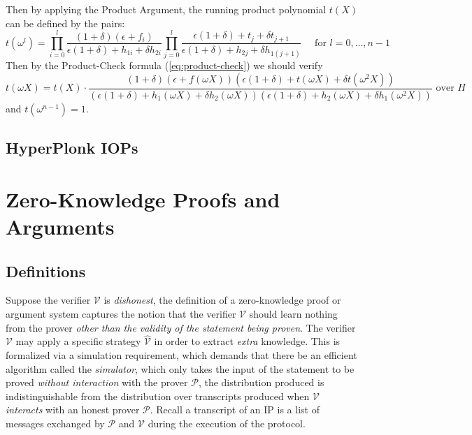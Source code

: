 \documentclass{article}
\begin{document}
Then by applying the Product Argument, the running product polynomial $t(X)$ can be defined by the pairs:
\begin{equation*}
t(\omega^l) = \prod_{i = 0}^{l} \frac{(1 + \delta) (\epsilon + f_i)}{\epsilon(1 + \delta) + h_{1i} + \delta h_{2i}} \prod_{j = 0}^{l} \frac{\epsilon(1 + \delta) + t_j + \delta t_{j + 1}}{\epsilon(1 + \delta) + h_{2j} + \delta h_{1(j+1)}} \quad \text{ for } l = 0, \dots, n-1
\end{equation*}
Then by the Product-Check formula (\ref{eq:product-check}) we should verify 
\begin{equation*}
t(\omega X) = t(X) \cdot \frac{(1 + \delta) (\epsilon + f(\omega X)) (\epsilon ( 1 + \delta) + t(\omega X) + \delta t(\omega^2 X))}{(\epsilon (1 + \delta) + h_1(\omega X) + \delta h_2(\omega X)) (\epsilon (1 + \delta) + h_2(\omega X) + \delta h_1(\omega^2 X))} \text{ over } H 
\end{equation*}
and $t(\omega^{n-1}) = 1$.

\subsection{HyperPlonk IOPs}

\cite{chen2022hyperplonk}

\section{Zero-Knowledge Proofs and Arguments}

\subsection{Definitions}

Suppose the verifier $\mathcal{V}$ is \textit{dishonest}, the definition of a zero-knowledge proof or argument system captures the notion that the verifier $\mathcal{V}$ should learn nothing from the prover \textit{other than the validity of the statement being proven}. The verifier $\mathcal{V}$ may apply a specific strategy $\hat{\mathcal{V}}$ in order to extract \textit{extra} knowledge. This is formalized via a simulation requirement, which demands that there be an efficient algorithm called the \textit{simulator}, which only takes the input of the statement to be proved \textit{without interaction} with the prover $\mathcal{P}$, the distribution produced is indistinguishable from the distribution over transcripts produced when $\mathcal{V}$ \textit{interacts} with an honest prover $\mathcal{P}$. Recall a transcript of an IP is a list of messages exchanged by $\mathcal{P}$ and $\mathcal{V}$ during the execution of the protocol.
\end{document}
